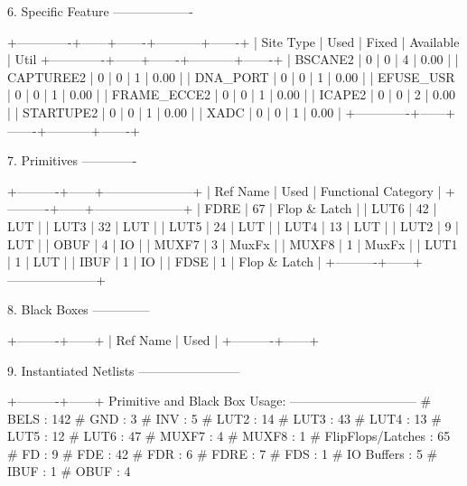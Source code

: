 \documentclass{article}
\begin{document}
6. Specific Feature
-------------------

+-------------+------+-------+-----------+-------+
|  Site Type  | Used | Fixed | Available | Util%
+-------------+------+-------+-----------+-------+
| BSCANE2     |    0 |     0 |         4 |  0.00 |
| CAPTUREE2   |    0 |     0 |         1 |  0.00 |
| DNA_PORT    |    0 |     0 |         1 |  0.00 |
| EFUSE_USR   |    0 |     0 |         1 |  0.00 |
| FRAME_ECCE2 |    0 |     0 |         1 |  0.00 |
| ICAPE2      |    0 |     0 |         2 |  0.00 |
| STARTUPE2   |    0 |     0 |         1 |  0.00 |
| XADC        |    0 |     0 |         1 |  0.00 |
+-------------+------+-------+-----------+-------+


7. Primitives
-------------

+----------+------+---------------------+
| Ref Name | Used | Functional Category |
+----------+------+---------------------+
| FDRE     |   67 |        Flop & Latch |
| LUT6     |   42 |                 LUT |
| LUT3     |   32 |                 LUT |
| LUT5     |   24 |                 LUT |
| LUT4     |   13 |                 LUT |
| LUT2     |    9 |                 LUT |
| OBUF     |    4 |                  IO |
| MUXF7    |    3 |               MuxFx |
| MUXF8    |    1 |               MuxFx |
| LUT1     |    1 |                 LUT |
| IBUF     |    1 |                  IO |
| FDSE     |    1 |        Flop & Latch |
+----------+------+---------------------+


8. Black Boxes
--------------

+----------+------+
| Ref Name | Used |
+----------+------+


9. Instantiated Netlists
------------------------

+----------+------+
\fi
\iffalse
Primitive and Black Box Usage:
------------------------------
# BELS                             : 142
#      GND                         : 3
#      INV                         : 5
#      LUT2                        : 14
#      LUT3                        : 43
#      LUT4                        : 13
#      LUT5                        : 12
#      LUT6                        : 47
#      MUXF7                       : 4
#      MUXF8                       : 1
# FlipFlops/Latches                : 65
#      FD                          : 9
#      FDE                         : 42
#      FDR                         : 6
#      FDRE                        : 7
#      FDS                         : 1
# IO Buffers                       : 5
#      IBUF                        : 1
#      OBUF                        : 4
\end{document}
